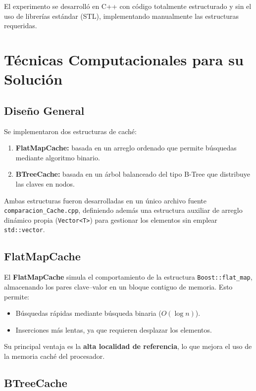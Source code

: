 \documentclass[12pt,a4paper]{article}
\begin{document}
El experimento se desarrolló en C++ con código totalmente estructurado y sin el uso de librerías estándar (STL),  
implementando manualmente las estructuras requeridas.

\section{Técnicas Computacionales para su Solución}

\subsection{Diseño General}

Se implementaron dos estructuras de caché:

\begin{enumerate}
    \item \textbf{FlatMapCache:} basada en un arreglo ordenado que permite búsquedas mediante algoritmo binario.
    \item \textbf{BTreeCache:} basada en un árbol balanceado del tipo B-Tree que distribuye las claves en nodos.
\end{enumerate}

Ambas estructuras fueron desarrolladas en un único archivo fuente \texttt{comparacion\_Cache.cpp},  
definiendo además una estructura auxiliar de arreglo dinámico propia (\texttt{Vector<T>})  
para gestionar los elementos sin emplear \texttt{std::vector}.

\subsection{FlatMapCache}

El \textbf{FlatMapCache} simula el comportamiento de la estructura \texttt{Boost::flat\_map}, almacenando los pares clave–valor en un bloque contiguo de memoria.  
Esto permite:
\begin{itemize}
    \item Búsquedas rápidas mediante búsqueda binaria (\(O(\log n)\)).
    \item Inserciones más lentas, ya que requieren desplazar los elementos.
\end{itemize}

Su principal ventaja es la \textbf{alta localidad de referencia}, lo que mejora el uso de la memoria caché del procesador.

\subsection{BTreeCache}
\end{document}
